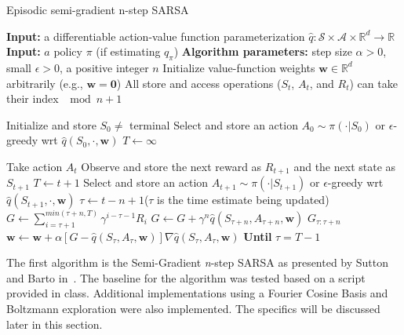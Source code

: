 \documentclass[journal]{IEEEtran}
\begin{document}
\begin{algorithm}
    \caption{Episodic semi-gradient n-step SARSA~\cite{sutton2018}}
    \label{alg:semi-grad_sarsa}
    \begin{algorithmic}\small
      \State \textbf{Input:} a differentiable action-value function parameterization 
      \(\hat{q}:\mathcal{S} \times \mathcal{A} \times \mathbb{R}^d \rightarrow \mathbb{R}\)
      \State \textbf{Input:} \(a\) policy \(\pi\) (if estimating \(q_\pi\)) 
      \State \textbf{Algorithm parameters:} step size \(\alpha>0\), small \(\epsilon>0\), 
          a positive integer \(n\)
      \State Initialize value-function weights \(\mathbf{w} \in \mathbb{R}^d\) arbitrarily 
          (e.g., \(\mathbf{w} = \mathbf{0}\)) 
      \State All store and access operations (\(S_t\), \(A_t\), and \(R_t\)) 
          can take their index \(\mod n+1\)

        \State Initialize and store \(S_0\neq\) terminal
        \State Select and store an action \(A_0\sim\pi(\cdot|S_0)\) 
        \State \quad or \(\epsilon\)-greedy wrt \(\hat{q}(S_0,\cdot,\mathbf{w})\)
        \State \(T\leftarrow\infty\)

            \State Take action \(A_t\) 
            \State Observe and store the next reward as \(R_{t+1}\) 
            \State \quad and the next state as \(S_{t+1}\)
              \State \(T \leftarrow t+1\)
            \Else
              \State Select and store an action \(A_{t+1}\sim\pi(\cdot|S_{t+1})\) or 
              \State \quad \(\epsilon\)-greedy wrt \(\hat{q}(S_{t+1},\cdot,\mathbf{w})\)
            \EndIf
            \State \(\tau \leftarrow t-n+1\)\qquad (\(\tau\) is the time estimate being updated)
          \EndIf
            \State \(G \leftarrow \sum^{min(\tau+n,T)}_{i=\tau+1}\gamma^{i-\tau-1}R_i \)
              \State\(G\leftarrow G+\gamma^n \hat{q}(S_{\tau+n},A_{\tau+n},\mathbf{w})\)
              \Comment \(G_{\tau:\tau+n}\)
            \EndIf
            \State \(\mathbf{w}\leftarrow\mathbf{w}+\alpha[G-\hat{q}(S_\tau,A_\tau,\mathbf{w})] 
                \nabla\hat{q}(S_\tau,A_\tau,\mathbf{w})\)
          \EndIf
        \EndFor
        \State \textbf{Until} \(\tau = T-1\)
      \EndFor
    \end{algorithmic}
\end{algorithm}

The first algorithm is the Semi-Gradient \emph{n}-step SARSA as presented by Sutton and Barto
in~\cite{sutton2018}. 
The baseline for the algorithm was tested based on a script provided in class.
Additional implementations using a Fourier Cosine Basis and Boltzmann exploration were 
also implemented. The specifics will be discussed later in this section.
\end{document}
